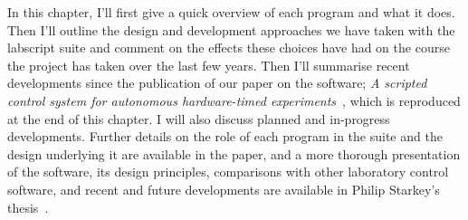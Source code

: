 In this chapter, I'll first give a quick overview of each program and what it does. Then I'll outline the design and development approaches we have taken with the labscript suite and comment on the effects these choices have had on the course the project has taken over the last few years. Then I'll summarise recent developments since the publication of our paper on the software; \emph{A scripted control system for autonomous hardware-timed experiments}~\cite{starkey_scripted_2013}, which is reproduced at the end of this chapter. I will also discuss planned and in-progress developments. Further details on the role of each program in the suite and the design underlying it are available in the paper, and a more thorough presentation of the software, its design principles, comparisons with other laboratory control software, and recent and future developments are available in Philip Starkey's thesis~\cite{starkey_thesis_2018}.

